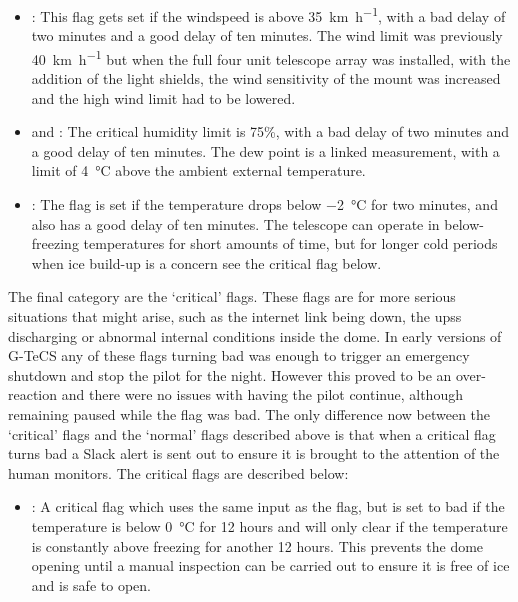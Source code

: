 \begin{colsection}
\begin{colsection}
\begin{itemize}
    \item {}: This flag gets set if the windspeed is above \SI{35}{\kilo\meter\per\hour}, with a bad delay of two minutes and a good delay of ten minutes. The wind limit was previously \SI{40}{\kilo\metre\per\hour} but when the full four unit telescope array was installed, with the addition of the light shields, the wind sensitivity of the mount was increased and the high wind limit had to be lowered.

    \item {} and : The critical humidity limit is 75\%, with a bad delay of two minutes and a good delay of ten minutes. The dew point is a linked measurement, with a limit of \SI{4}{\celsius} above the ambient external temperature.

    \item {}: The  flag is set if the temperature drops below \SI{-2}{\celsius} for two minutes, and also has a good delay of ten minutes. The telescope can operate in below-freezing temperatures for short amounts of time, but for longer cold periods when ice build-up is a concern see the critical  flag below.

\end{itemize}

The final category are the `critical' flags. These flags are for more serious situations that might arise, such as the internet link being down, the \glspl{ups} discharging or abnormal internal conditions inside the dome. In early versions of G-TeCS any of these flags turning bad was enough to trigger an emergency shutdown and stop the pilot for the night. However this proved to be an over-reaction and there were no issues with having the pilot continue, although remaining paused while the flag was bad. The only difference now between the `critical' flags and the `normal' flags described above is that when a critical flag turns bad a Slack alert is sent out to ensure it is brought to the attention of the human monitors. The critical flags are described below:

\begin{itemize}
    \item {}: A critical flag which uses the same input as the  flag, but is set to bad if the temperature is below \SI{0}{\celsius} for 12 hours and will only clear if the temperature is constantly above freezing for another 12 hours. This prevents the dome opening until a manual inspection can be carried out to ensure it is free of ice and is safe to open.


\end{itemize}
\end{colsection}
\end{colsection}

